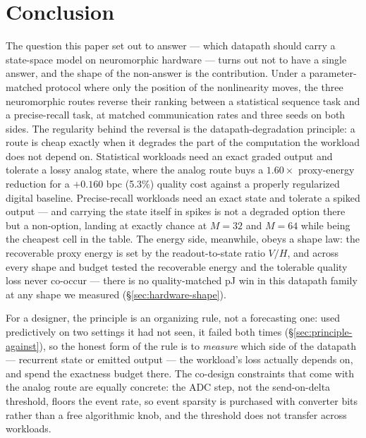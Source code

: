 
\section{Conclusion}
\label{sec:conclusion}

The question this paper set out to answer --- which datapath should carry a state-space
model on neuromorphic hardware --- turns out not to have a single answer, and the shape
of the non-answer is the contribution. Under a parameter-matched protocol where only the
position of the nonlinearity moves, the three neuromorphic routes reverse their ranking
between a statistical sequence task and a precise-recall task, at matched communication
rates and three seeds on both sides. The regularity behind the reversal is the
datapath-degradation principle: a route is cheap exactly when it degrades the part of the
computation the workload does not depend on. Statistical workloads need an exact graded
output and tolerate a lossy analog state, where the analog route buys a $1.60\times$
proxy-energy reduction for a $+0.160$ bpc (5.3\%) quality cost against a properly
regularized digital baseline. Precise-recall workloads need an exact state and tolerate a
spiked output --- and carrying the state itself in spikes is not a degraded option there
but a non-option, landing at exactly chance at $M{=}32$ and $M{=}64$ while being the
cheapest cell in the table. The energy side, meanwhile, obeys a shape law: the recoverable
proxy energy is set by the readout-to-state ratio $V/H$, and across every shape and budget
tested the recoverable energy and the tolerable quality loss never co-occur --- there is
no quality-matched pJ win in this datapath family at any shape we measured
(\S\ref{sec:hardware-shape}).

For a designer, the principle is an organizing rule, not a forecasting one: used
predictively on two settings it had not seen, it failed both times
(\S\ref{sec:principle-against}), so the honest form of the rule is to \emph{measure} which
side of the datapath --- recurrent state or emitted output --- the workload's loss
actually depends on, and spend the exactness budget there. The
co-design constraints that come with the analog route are equally concrete: the ADC step,
not the send-on-delta threshold, floors the event rate, so event sparsity is purchased
with converter bits rather than a free algorithmic knob, and the threshold does not
transfer across workloads.

